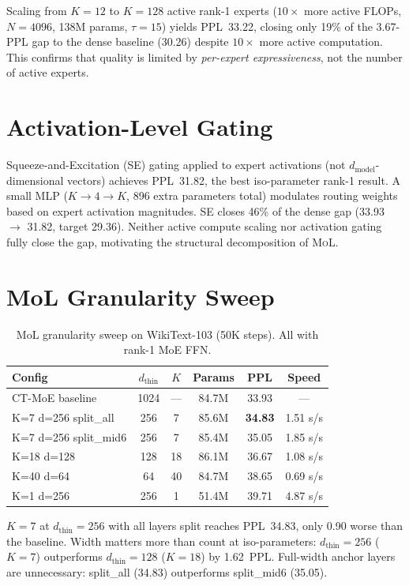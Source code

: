 \documentclass[10pt]{article}
\newcommand{\mol}{\textsc{MoL}}
\newcommand{\dmodel}{d_\text{model}}
\newcommand{\dthin}{d_\text{thin}}
\begin{document}
Scaling from $K{=}12$ to $K{=}128$ active rank-1 experts ($10\times$ more active FLOPs, $N{=}4096$, 138M params, $\tau{=}15$) yields PPL~33.22, closing only 19\% of the 3.67-PPL gap to the dense baseline (30.26) despite $10\times$ more active computation.
This confirms that quality is limited by \emph{per-expert expressiveness}, not the number of active experts.

\section{Activation-Level Gating}
\label{app:se_gating}

Squeeze-and-Excitation (SE) gating \citep{hu2018squeeze} applied to expert activations (not $\dmodel$-dimensional vectors) achieves PPL~31.82, the best iso-parameter rank-1 result.
A small MLP ($K {\to} 4 {\to} K$, 896 extra parameters total) modulates routing weights based on expert activation magnitudes.
SE closes 46\% of the dense gap (33.93 $\to$ 31.82, target 29.36).
Neither active compute scaling nor activation gating fully close the gap, motivating the structural decomposition of \mol{}.

\section{MoL Granularity Sweep}
\label{app:granularity}

\begin{table}[h]
\centering
\caption{MoL granularity sweep on WikiText-103 (50K steps). All with rank-1 MoE FFN.}
\label{tab:mol_sweep}
\small
\begin{tabular}{lccccc}
\toprule
Config & $\dthin$ & $K$ & Params & PPL & Speed \\
\midrule
CT-MoE baseline & 1024 & --- & 84.7M & 33.93 & --- \\
K=7 d=256 split\_all & 256 & 7 & 85.6M & \textbf{34.83} & 1.51 s/s \\
K=7 d=256 split\_mid6 & 256 & 7 & 85.4M & 35.05 & 1.85 s/s \\
K=18 d=128 & 128 & 18 & 86.1M & 36.67 & 1.08 s/s \\
K=40 d=64 & 64 & 40 & 84.7M & 38.65 & 0.69 s/s \\
K=1 d=256 & 256 & 1 & 51.4M & 39.71 & 4.87 s/s \\
\bottomrule
\end{tabular}
\end{table}

$K{=}7$ at $\dthin{=}256$ with all layers split reaches PPL~34.83, only 0.90 worse than the baseline.
Width matters more than count at iso-parameters: $\dthin{=}256$ ($K{=}7$) outperforms $\dthin{=}128$ ($K{=}18$) by 1.62~PPL.
Full-width anchor layers are unnecessary: split\_all (34.83) outperforms split\_mid6 (35.05).
\end{document}
